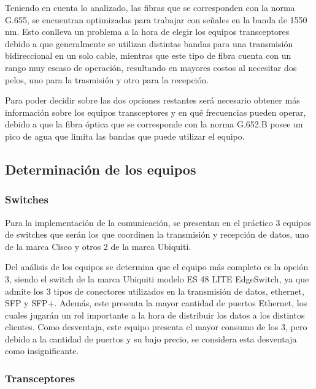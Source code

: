 \documentclass[11pt,a4paper]{article}
\begin{document}
Teniendo en cuenta lo analizado, las fibras que se corresponden con la norma G.655, se encuentran optimizadas para trabajar con señales en la banda de 1550 nm.
Esto conlleva un problema a la hora de elegir los equipos transceptores debido a que generalmente se utilizan distintas bandas para una transmisión bidireccional en un solo cable, mientras que este tipo de fibra cuenta con un rango muy escaso de operación, resultando en mayores costos al necesitar dos pelos, uno para la trasmisión y otro para la recepción.

Para poder decidir sobre las dos opciones restantes será necesario obtener más información sobre los equipos transceptores y en qué frecuencias pueden operar, debido a que la fibra óptica que se corresponde con la norma G.652.B posee un pico de agua que limita las bandas que puede utilizar el equipo.


\subsection{Determinación de los equipos}

\subsubsection{Switches}

Para la implementación de la comunicación, se presentan en el práctico 3 equipos de switches que serán los que coordinen la transmisión y recepción de datos, uno de la marca Cisco y otros 2 de la marca Ubiquiti. 

Del análisis de los equipos se determina que el equipo más completo es la opción 3, siendo el switch de la marca Ubiquiti modelo ES 48 LITE EdgeSwitch, ya que admite los 3 tipos de conectores utilizados en la transmisión de datos, ethernet, SFP y SFP+. 
Además, este presenta la mayor cantidad de puertos Ethernet, los cuales jugarán un rol importante a la hora de distribuir los datos a los distintos clientes. 
Como desventaja, este equipo presenta el mayor consumo de los 3, pero debido a la cantidad de puertos y su bajo precio, se considera esta desventaja como insignificante. 

\subsubsection{Transceptores}
\end{document}
